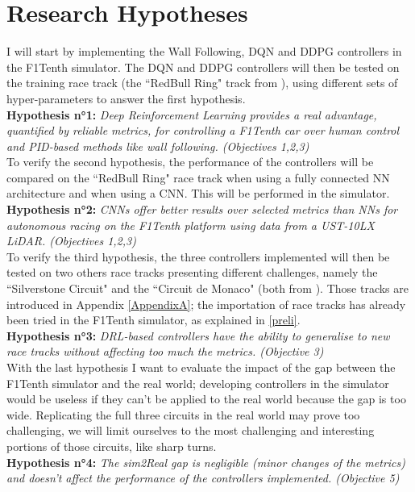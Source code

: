 \section{Research Hypotheses}
\label{reshypo}
I will start by implementing the Wall Following, DQN and DDPG controllers in the F1Tenth simulator. The DQN and DDPG controllers will then be tested on the training race track (the ``RedBull Ring" track from \cite{bosello}), using different sets of hyper-parameters to answer the first hypothesis. \\
\textbf{Hypothesis n°1:} \textit{Deep Reinforcement Learning provides a real advantage, quantified by reliable metrics, for controlling a F1Tenth car over human control and PID-based methods like wall following. (Objectives 1,2,3)} \\
To verify the second hypothesis, the performance of the controllers will be compared on the ``RedBull Ring" race track when using a fully connected NN architecture and when using a CNN. This will be performed in the simulator. \\
\textbf{Hypothesis n°2:} \textit{CNNs offer better results over selected metrics than NNs for autonomous racing on the F1Tenth platform using data from a UST-10LX LiDAR. (Objectives 1,2,3)}\\
To verify the third hypothesis, the three controllers implemented will then be tested on two others race tracks presenting different challenges, namely the ``Silverstone Circuit" and the ``Circuit de Monaco" (both from \cite{bosello}). Those tracks are introduced in Appendix \ref{AppendixA}; the importation of race tracks has already been tried in the F1Tenth simulator, as explained in \ref{preli}.\\
\textbf{Hypothesis n°3:} \textit{DRL-based controllers have the ability to generalise to new race tracks without affecting too much the metrics. (Objective 3)} \\
With the last hypothesis I want to evaluate the impact of the gap between the F1Tenth simulator and the real world; developing controllers in the simulator would be useless if they can't be applied to the real world because the gap is too wide. Replicating the full three circuits in the real world may prove too challenging, we will limit ourselves to the most challenging and interesting portions of those circuits, like sharp turns.\\
\textbf{Hypothesis n°4:} \textit{The sim2Real gap is negligible (minor changes of the metrics) and doesn't affect the performance of the controllers implemented. (Objective 5)}\\



